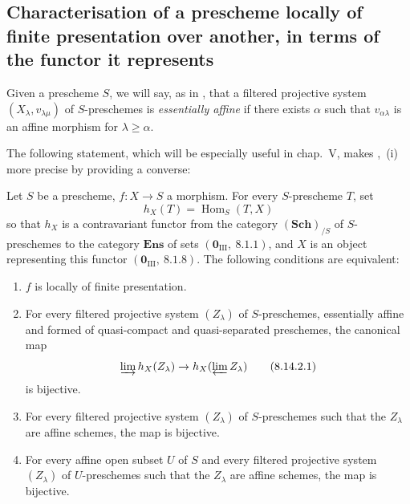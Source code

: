 \subsection{Characterisation of a prescheme locally of finite presentation over another, in terms of the functor it represents}
\label{subsection:IV.8.14}

\begin{env}[8.14.1]
\label{IV.8.14.1}
Given a prescheme $S$, we will say, as in , that a filtered projective system $(X_\lambda,v_{\lambda\mu})$ of $S$-preschemes is \emph{essentially affine} if there exists $\alpha$ such that $v_{\alpha\lambda}$ is an affine morphism for $\lambda\geqslant\alpha$.

The following statement, which will be especially useful in chap.~V, makes ,~(i) more precise by providing a converse:
\end{env}

\begin{proposition}[8.14.2]
\label{IV.8.14.2}
Let $S$ be a prescheme, $f:X\to S$ a morphism.
For every $S$-prescheme $T$, set
\[
h_X(T)=\operatorname{Hom}_S(T,X)
\]
so that $h_X$ is a contravariant functor from the category $(\mathbf{Sch})_{/S}$ of $S$-preschemes to the category $\mathbf{Ens}$ of sets $(\mathbf{0}_{\text{III}},~8.1.1)$, and $X$ is an object representing this functor $(\mathbf{0}_{\text{III}},~8.1.8)$.
The following conditions are equivalent:
\begin{enumerate}[label=\emph{\alph*)}]
  \item $f$ is locally of finite presentation.
  \item For every filtered projective system $(Z_\lambda)$ of $S$-preschemes, essentially affine  and formed of quasi-compact and quasi-separated preschemes, the canonical map 
\begin{equation}
\label{IV.8.14.2.1}
\varinjlim h_X(Z_\lambda)\to h_X(\varprojlim Z_\lambda) \tag{8.14.2.1}
\end{equation}
is bijective.
  \item For every filtered projective system $(Z_\lambda)$ of $S$-preschemes such that the $Z_\lambda$ are affine schemes, the map  is bijective.
  \item[\rm c$'$)] For every affine open subset $U$ of $S$ and every filtered projective system $(Z_\lambda)$ of $U$-preschemes such that the $Z_\lambda$ are affine schemes, the map  is bijective.
\end{enumerate}
\end{proposition}

